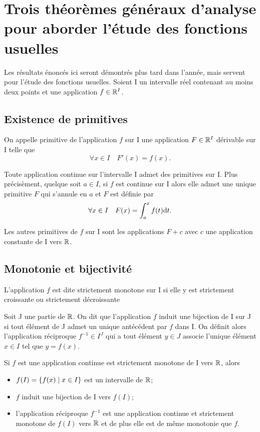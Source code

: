 \chapter{Trois théorèmes généraux d'analyse pour aborder l'étude des fonctions usuelles}
\label{chap:theogen}
Les résultats énoncés ici seront démontrés plus tard dans l'année, mais servent pour l'étude des fonctions usuelles. Soient I un intervalle réel contenant au moins deux points et une application \(f \in \mathbb{R}^I\).
%
\section{Existence de primitives}
%
\begin{defdef}
  On appelle primitive de l'application \(f\) sur I une application \(F \in \mathbb{R}^I\) dérivable sur I telle que
  \begin{equation}
    \forall x \in I \quad F'(x)=f(x).
  \end{equation}
\end{defdef}
\begin{theo}
  Toute application continue sur l'intervalle I admet des primitives sur I. Plus précisèment, quelque soit \(a \in I\), si \(f\) est continue sur I alors elle admet une unique primitive \(F\) qui s'annule en \(a\) et \(F\) est définie par
  \begin{equation}
    \forall x \in I \quad F(x)=\int_{a}^x f(t) \mathrm{d} t.
  \end{equation}
\end{theo}
Les autres primitives de \(f\) sur I sont les applications \(F+c\) avec \(c\) une application constante de I vers \(\mathbb{R}\).
%
\section{Monotonie et bijectivité}
%
\begin{defdef}
  L'application \(f\) est dite strictement monotone sur I si elle y est strictement croissante ou strictement décroissante
\end{defdef}
\begin{defdef}
  Soit J une partie de \(\mathbb{R}\). On dit que l'application \(f\) induit une bijection de I sur J si tout élément de J admet un unique antécédent par \(f\) dans I. On définit alors l'application réciproque \(f^{-1} \in I^J\) qui a tout élément \(y \in J\) associe l'unique élément \(x \in I\) tel que \(y=f(x)\).
\end{defdef}
\begin{theo}
  Si \(f\) est une application continue est strictement monotone de I vers \(\mathbb{R}\), alors
  \begin{itemize}
  \item \(f(I)=\left\{f(x)\mathrel{}\middle|\mathrel{}x \in I\right\}\) est un intervalle de \(\mathbb{R}\);
  \item \(f\) induit une bijection de I vers \(f(I)\);
  \item l'application réciproque \(f^{-1}\) est une application continue et strictement monotone de \(f(I)\) vers \(\mathbb{R}\) et de plus elle est de même monotonie que \(f\).
  \end{itemize}
\end{theo}
%
